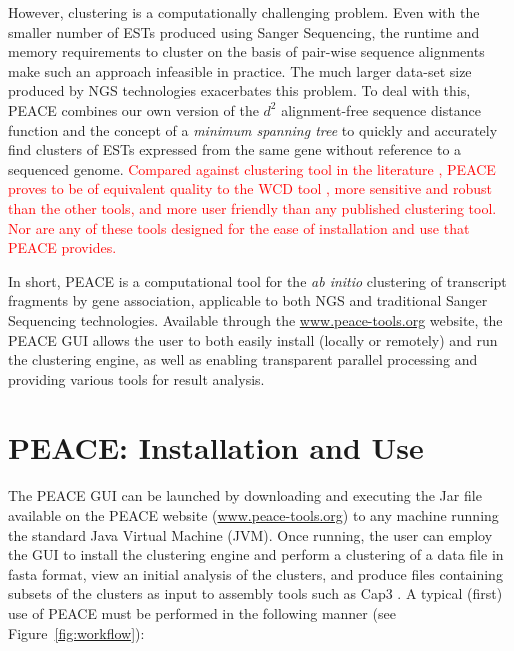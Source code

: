 \documentclass[a4,center,fleqn]{NAR}
\newcommand{\mc}[1]{\textcolor{red}{#1}}
\newcommand{\peace} {{\small PEACE}}
\newcommand{\wcd} {{\small WCD}}
\newcommand{\capthree} {{\small Cap3}}
\begin{document}
However, clustering is a computationally challenging problem.  Even
with the smaller number of ESTs produced using Sanger Sequencing, the
runtime and memory requirements to cluster on the basis of pair-wise
sequence alignments make such an approach infeasible in practice.  The
much larger data-set size produced by NGS technologies exacerbates
this problem.  To deal with this, \peace\/ combines our own version of
the $d^2$ alignment-free sequence distance function \cite{Hide94} and
the concept of a {\it minimum spanning tree} \cite{Prim57} to quickly
and accurately find clusters of ESTs expressed from the same gene
without reference to a sequenced genome.  \mc{Compared against
  clustering tool in the literature
  \cite{Burke99,Slater00,Huang99,Parkinson02,Kalyanaraman03,Malde03,
    Ptitsyn05,Hazelhurst08a,Picardi09}, \peace\/ proves to be of
  equivalent quality to the \wcd\/ tool \cite{Hazelhurst08a}, more
  sensitive and robust than the other tools, and more user friendly
  than any published clustering tool.  Nor are any of} \mc{these tools
  designed for the ease of installation and use that \peace\/
  provides.}

In short, \peace\/ is a computational tool for the {\it ab initio}
clustering of transcript fragments by gene association, applicable to
both NGS and traditional Sanger Sequencing technologies.  Available
through the \href{http://www.peace-tools.org}{www.peace-tools.org}
website, the \peace\/ GUI allows the user to both easily install
(locally or remotely) and run the clustering engine, as well as
enabling transparent parallel processing and providing various tools
for result analysis.

\section{\peace: Installation and Use}

The \peace\/ GUI can be launched by downloading and executing the
Jar file available on the \peace\/ website
(\href{http://www.peace-tools.org}{www.peace-tools.org}) to any
machine running the standard Java Virtual Machine (JVM).  Once
running, the user can employ the GUI to install the clustering engine
and perform a clustering of a data file in {\sc fasta} format, view an
initial analysis of the clusters, and produce files containing subsets
of the clusters as input to assembly tools such as \capthree\/ 
\cite{Huang99}.  A typical (first) use of \peace\/ must be
performed in the following manner (see Figure~\ref{fig:workflow}):
\end{document}
